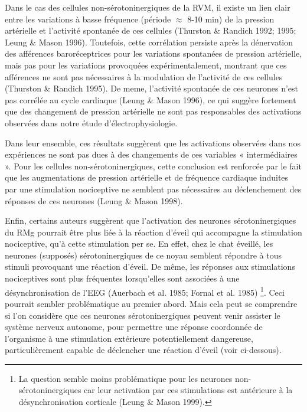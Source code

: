 \documentclass[a4paper,12pt,twoside]{report}
\begin{document}
Dans le cas des cellules non-sérotoninergiques de la RVM, il existe un lien clair entre les variations à basse fréquence (période $\approx$ 8-10 min) de la pression artérielle et l’activité spontanée de ces cellules (Thurston \& Randich 1992; 1995; Leung \& Mason 1996). Toutefois, cette corrélation persiste après la dénervation des afférences baroréceptrices pour les variations spontanées de pression artérielle, mais pas pour les variations provoquées expérimentalement, montrant que ces afférences ne sont pas nécessaires à la modulation de l’activité de ces cellules (Thurston \& Randich 1995). De meme, l’activité spontanée de ces neurones n’est pas corrélée au cycle cardiaque (Leung \& Mason 1996), ce qui suggère fortement que des changement de pression artérielle ne sont pas responsables des activations observées dans notre étude d’électrophysiologie. 

Dans leur ensemble, ces résultats suggèrent que les activations observées dans nos expériences ne sont pas dues à des changements de ces variables « intermédiaires ». Pour les cellules non-sérotoninergiques, cette conclusion est renforcée par le fait que les augmentations de pression artérielle et de fréquence cardiaque induites par une stimulation nociceptive ne semblent pas nécessaires au déclenchement des réponses de ces neurones (Leung \& Mason 1998).

\bigskip 

Enfin, certains auteurs suggèrent que l’activation des neurones sérotoninergiques du RMg pourrait être plus liée à la réaction d’éveil qui accompagne la stimulation nociceptive, qu’à cette stimulation per se. En effet, chez le chat éveillé, les neurones (supposés) sérotoninergiques de ce noyau semblent répondre à tous stimuli provoquant une réaction d’éveil. De même, les réponses aux stimulations nociceptives sont plus fréquentes lorsqu’elles sont associées à une désynchronisation de l’EEG (Auerbach et al. 1985; Fornal et al. 1985)
\footnote{La question semble moins problématique pour les neurones non-sérotoninergiques car leur activation par ces stimulations est antérieure à la désynchronisation corticale (Leung \& Mason 1999).}. 
Ceci pourrait sembler problématique au premier abord. Mais cela peut se comprendre si l’on considère que ces neurones sérotoninergiques peuvent venir assister le système nerveux autonome, pour permettre une réponse coordonnée de l’organisme à une stimulation extérieure potentiellement dangereuse, particulièrement capable de déclencher une réaction d’éveil (voir ci-dessous).
\end{document}
